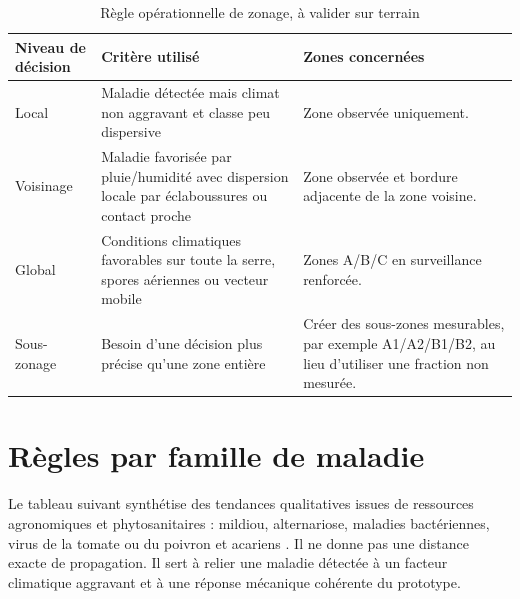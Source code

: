 ﻿\documentclass[11pt,a4paper,openany]{report}
\begin{document}
\begin{table}[H]
\centering
\renewcommand{\arraystretch}{1.3}

\begin{tabular}{|p{4cm}|p{4cm}|p{6cm}|}
\hline
\textbf{Niveau de décision} &
\textbf{Critère utilisé} &
\textbf{Zones concernées} \\
\hline

Local &
Maladie détectée mais climat non aggravant et classe peu dispersive &
Zone observée uniquement. \\
\hline

Voisinage &
Maladie favorisée par pluie/humidité avec dispersion locale par éclaboussures ou contact proche &
Zone observée et bordure adjacente de la zone voisine. \\
\hline

Global &
Conditions climatiques favorables sur toute la serre, spores aériennes ou vecteur mobile &
Zones A/B/C en surveillance renforcée. \\
\hline

Sous-zonage &
Besoin d'une décision plus précise qu'une zone entière &
Créer des sous-zones mesurables, par exemple A1/A2/B1/B2, au lieu d'utiliser une fraction non mesurée. \\
\hline

\end{tabular}

\caption{Règle opérationnelle de zonage, à valider sur terrain}
\label{tab:decision_zonale}

\end{table}

\section{Règles par famille de maladie}
Le tableau suivant synthétise des tendances qualitatives issues de ressources agronomiques et phytosanitaires : mildiou, alternariose, maladies bactériennes, virus de la tomate ou du poivron et acariens \cite{umnlateblight,umnearlyblight,ndsupotatoearly,ndsupotatolate,iowabacterialspot,ncsurbacterialspot,nctylcv,pennstatetomato,umnspidermites}. Il ne donne pas une distance exacte de propagation. Il sert à relier une maladie détectée à un facteur climatique aggravant et à une réponse mécanique cohérente du prototype.
\end{document}
